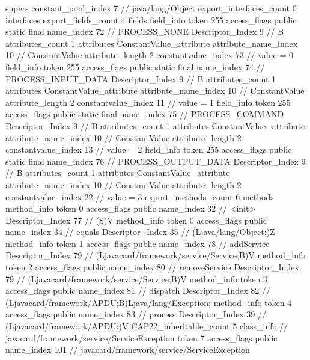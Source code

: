 {{{			supers {
				constant_pool_index	7		// java/lang/Object
			}
			export_interfaces_count	0
			interfaces {
			}
			export_fields_count	4
			fields {
			field_info {
				token	255
				access_flags	public static final
				name_index	72		// PROCESS_NONE
				Descriptor_Index	9		// B
				attributes_count	1
				attributes {
				ConstantValue_attribute {
					attribute_name_index	10		// ConstantValue
					attribute_length	2
					constantvalue_index	73		// value = 0
				}
				}
			}
			field_info {
				token	255
				access_flags	public static final
				name_index	74		// PROCESS_INPUT_DATA
				Descriptor_Index	9		// B
				attributes_count	1
				attributes {
				ConstantValue_attribute {
					attribute_name_index	10		// ConstantValue
					attribute_length	2
					constantvalue_index	11		// value = 1
				}
				}
			}
			field_info {
				token	255
				access_flags	public static final
				name_index	75		// PROCESS_COMMAND
				Descriptor_Index	9		// B
				attributes_count	1
				attributes {
				ConstantValue_attribute {
					attribute_name_index	10		// ConstantValue
					attribute_length	2
					constantvalue_index	13		// value = 2
				}
				}
			}
			field_info {
				token	255
				access_flags	public static final
				name_index	76		// PROCESS_OUTPUT_DATA
				Descriptor_Index	9		// B
				attributes_count	1
				attributes {
				ConstantValue_attribute {
					attribute_name_index	10		// ConstantValue
					attribute_length	2
					constantvalue_index	22		// value = 3
				}
				}
			}
			}
			export_methods_count	6
			methods {
				method_info {
					token	0
					access_flags	public
					name_index	32		// <init>
					Descriptor_Index	77		// (S)V
				}
				method_info {
					token	0
					access_flags	public
					name_index	34		// equals
					Descriptor_Index	35		// (Ljava/lang/Object;)Z
				}
				method_info {
					token	1
					access_flags	public
					name_index	78		// addService
					Descriptor_Index	79		// (Ljavacard/framework/service/Service;B)V
				}
				method_info {
					token	2
					access_flags	public
					name_index	80		// removeService
					Descriptor_Index	79		// (Ljavacard/framework/service/Service;B)V
				}
				method_info {
					token	3
					access_flags	public
					name_index	81		// dispatch
					Descriptor_Index	82		// (Ljavacard/framework/APDU;B)Ljava/lang/Exception;
				}
				method_info {
					token	4
					access_flags	public
					name_index	83		// process
					Descriptor_Index	39		// (Ljavacard/framework/APDU;)V
				}
			}
			CAP22_inheritable_count	5
		}
		class_info {		// javacard/framework/service/ServiceException
			token	7
			access_flags	public
			name_index	101		// javacard/framework/service/ServiceException
}}}

